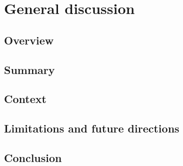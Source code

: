 \chapter{General discussion}

\clearpage
\section{Overview}
\lipsum[1-1]

\section{Summary}
\lipsum[1-2]

\section{Context}
\lipsum[1-3]

\section{Limitations and future directions}
\lipsum[1-4]

\section{Conclusion}
\lipsum[1-5]
\cite{Lakatos1970}

\clearpage
\printbibliography[heading=subbibliography]


